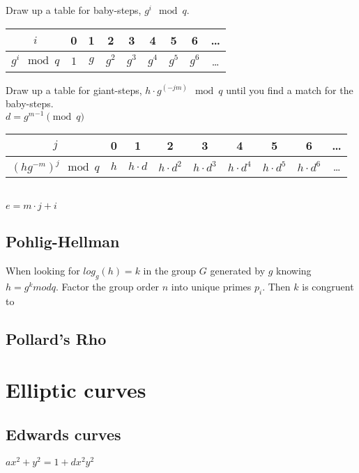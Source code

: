 \documentclass{article}
\begin{document}
Draw up a table for baby-steps, $g^i \mod q$.\\
\begin{tabular}{|c|c|c|c|c|c|c|c|c|}
\hline
$i $ & 0 & 1 & 2 & 3 & 4 & 5 & 6 & \ldots \\
\hline
$g^i \mod q$ & $1$ & $g$ & $g^2$ & $g^3$ & $g^4$ & $g^5$ & $g^6$ & \ldots \\
\hline
\end{tabular}

Draw up a table for giant-steps, $h \cdot g^(-jm) \mod q$ until you find a match for the baby-steps.\\
$d = {g^m}^{-1} \pmod{q}$\\
\begin{tabular}{|c|c|c|c|c|c|c|c|c|}
\hline
$j $ & 0 & 1 & 2 & 3 & 4 & 5 & 6 & \ldots \\
\hline
$(hg^{-m})^j \mod q$ & $h$ & $h \cdot d$ & $h \cdot d^2$ & $h \cdot d^3$ & $h \cdot d^4$ & $h \cdot d^5$ & $h \cdot d^6$ & \ldots \\
\hline
\end{tabular} \\
$e = m \cdot j + i$

\subsection{Pohlig-Hellman}
When looking for $log_g(h) = k$ in the group $G$ generated by $g$ knowing $h = g^k mod q$.
Factor the group order $n$ into unique primes $p_i$.
Then $k$ is congruent to 


\subsection{Pollard's Rho}


\section{Elliptic curves}
\subsection{Edwards curves}
$ax^2+y^2 = 1 + dx^2y^2$
\end{document}
